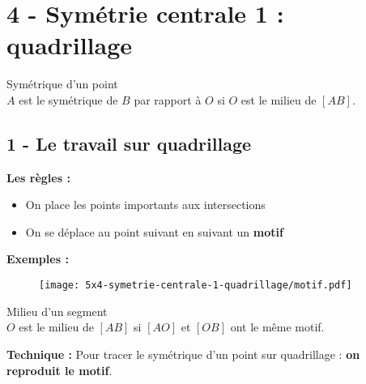 



\section*{4 - Symétrie centrale 1 : quadrillage}

\begin{Definition}{Symétrique d'un point}\\
  $A$ est le symétrique de $B$ par rapport à $O$ si $O$ est le milieu de $[AB]$.
\end{Definition}

\subsection*{1 - Le travail sur quadrillage}

\textbf{Les règles : }

\begin{itemize}[label={$\bullet$}]
  \item On place les points importants aux intersections
  \item On se déplace au point suivant en suivant un \textbf{motif}
\end{itemize} 

\textbf{Exemples :}

\begin{figure}[H]
  \centering
  \texttt{[image: 5x4-symetrie-centrale-1-quadrillage/motif.pdf]}
\end{figure}

\begin{Definition}{Milieu d'un segment}\\
  $O$ est le milieu de $[AB]$ si $[AO]$ et $[OB]$ ont le même motif.
\end{Definition}

\textbf{Technique : }Pour tracer le symétrique d'un point sur quadrillage : \textbf{on reproduit le motif}.

